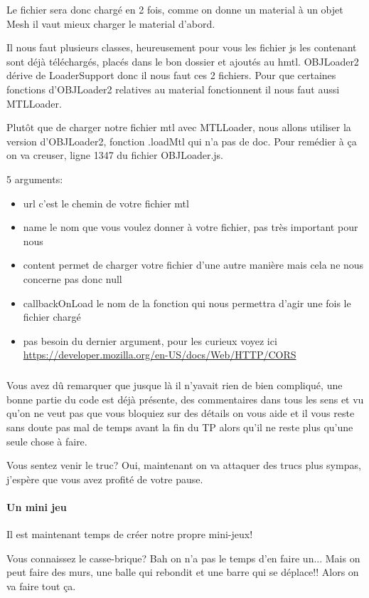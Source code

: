 \documentclass[a4paper,10pt]{article}
\begin{document}
Le fichier sera donc chargé en 2 fois, comme on donne un material à un objet Mesh il vaut mieux charger le material d'abord.

Il nous faut plusieurs classes, heureusement pour vous les fichier js les contenant sont déjà téléchargés, placés dans le bon dossier et ajoutés au hmtl. 
OBJLoader2 dérive de LoaderSupport donc il nous faut ces 2 fichiers. Pour que certaines fonctions d'OBJLoader2 relatives au material fonctionnent il nous faut aussi MTLLoader.

Plutôt que de charger notre fichier mtl avec MTLLoader, nous allons utiliser la version d'OBJLoader2, fonction .loadMtl qui n'a pas de doc. Pour remédier à ça on va creuser, ligne 1347 du fichier OBJLoader.js.

 5 arguments:
\begin{itemize}
\item url c'est le chemin de votre fichier mtl
\item name le nom que vous voulez donner à votre fichier, pas très important pour nous
\item content permet de charger votre fichier d'une autre manière mais cela ne nous concerne pas donc null
\item callbackOnLoad le nom de la fonction qui nous permettra d'agir une fois le fichier chargé
\item pas besoin du dernier argument, pour les curieux voyez ici \url{https://developer.mozilla.org/en-US/docs/Web/HTTP/CORS}
\end{itemize}

\subparagraph{}
Vous avez dû remarquer que jusque là il n'yavait rien de bien compliqué, une bonne partie du code est déjà présente, des commentaires dans tous les sens et vu qu'on ne veut pas que vous bloquiez sur des détails on vous aide et il vous reste sans doute pas mal de temps avant la fin du TP alors qu'il ne reste plus qu'une seule chose à faire.

Vous sentez venir le truc? Oui, maintenant on va attaquer des trucs plus sympas, j'espère que vous avez profité de votre pause.

\paragraph{Un mini jeu}
Il est maintenant temps de créer notre propre mini-jeux!

Vous connaissez le casse-brique? Bah on n'a pas le temps d'en faire un... Mais on peut faire des murs, une balle qui rebondit et une barre qui se déplace!! Alors on va faire tout ça.
\end{document}

